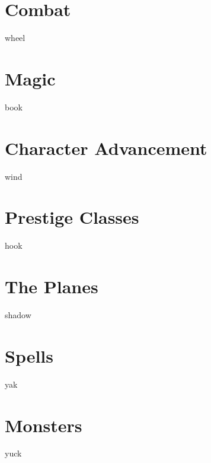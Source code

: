 \documentclass[12pt,twoside,onecolumn,openany,final]{memoir}
\begin{document}
\chapter{Combat}
wheel
\chapter{Magic}
book
\chapter{Character Advancement}
wind
\chapter{Prestige Classes}
hook



\chapter{The Planes}
shadow


\appendix
\appendixpage

\makeatletter
\renewcommand{\@makechapterhead}[1]{%
\vspace*{0 pt}{
\raggedright \normalfont \fontsize{32}{32} \selectfont \bfseries
\ifnum \value{secnumdepth}>-1
  \if@mainmatter \vspace{-8pt} {\fontsize{20}{20} \selectfont Appendix \thechapter:}\\[8pt]
  \fi%
\fi
\hspace{0.65cm} #1\par\nobreak\vspace{20 pt}
}}
\makeatother

\clearpage


\chapter{Spells}
yak
\chapter{Monsters}
yuck




\clearpage
{}
\listoftables

\clearpage
{}
\printindex
\end{document}
